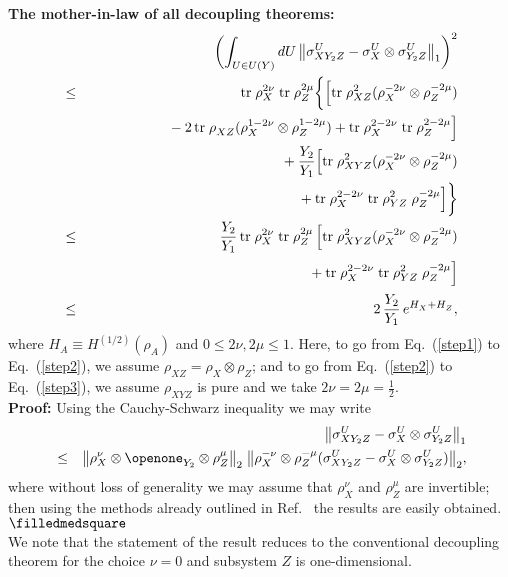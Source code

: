 \documentclass[twocolumn,aps,prl]{revtex4}
\begin{document}
\noindent
{\bf The mother-in-law of all decoupling theorems:}
\begin{eqnarray}
&&\biggl(\int_{U\in U(Y)}dU\,\bigl\| \sigma_{XY_2Z}^U-
\sigma_{X}^U\otimes \sigma_{Y_2Z}^U\bigr\|_1\biggr)^2\nonumber\\
&\le& {\text{tr}}\; \rho_{X}^{2\nu}\; {\text{tr}}\; \rho_{Z}^{2\mu}
\biggl\{\Bigl[ {\text{tr}}\; \rho_{XZ}^{2}
        ( \rho_{X}^{-2\nu}\otimes \rho_{Z}^{-2\mu})\nonumber\\
&&\phantom{{\text{tr}}\; \rho_{X}^{2\nu}\; {\text{tr}}\; \rho_{Z}^{2\mu}}
\;-2\, {\text{tr}}\; \rho_{XZ}^{\text{~}}
   (\rho_{X}^{1-2\nu}\otimes \rho_{Z}^{1-2\mu})
+{\text{tr}}\; \rho_{X}^{2-2\nu}\; {\text{tr}}\; \rho_{Z}^{2-2\mu}\Bigr]
\nonumber\\
&&\phantom{{\text{tr}}\; \rho_{X}^{2\nu}\; {\text{tr}} }
+\frac{Y_2}{Y_1}\Bigl[
{\text{tr}}\; \rho_{XYZ}^{2}
        ( \rho_{X}^{-2\nu}\otimes \rho_{Z}^{-2\mu}) \nonumber \\
&&\phantom{{\text{tr}}\; \rho_{X}^{2\nu}\; {\text{tr}}~~~~~~~~}
+{\text{tr}}\; \rho_{X}^{2-2\nu}\;
{\text{tr}}\; \rho_{YZ}^{2}\;\rho_{Z}^{-2\mu}\Bigr]
\biggr\} \label{step1}\\
&\le & \frac{Y_2}{Y_1}\, {\text{tr}}\; \rho_{X}^{2\nu}\;
{\text{tr}}\; \rho_{Z}^{2\mu}\,
\Bigl[
{\text{tr}}\; \rho_{XYZ}^{2}
        ( \rho_{X}^{-2\nu}\otimes \rho_{Z}^{-2\mu}) \nonumber \\
&&\phantom{\frac{Y_2}{Y_1}\, {\text{tr}}\; \rho_{X}^{2\nu}\; 
{\text{tr}}\; \rho_{Z}^{2\mu}\Bigl[\,}
+{\text{tr}}\; \rho_{X}^{2-2\nu}\; 
{\text{tr}}\; \rho_{YZ}^{2}\;\rho_{Z}^{-2\mu}\Bigr] \label{step2} \\
&\le & 2\, \frac{Y_2}{Y_1}\,
e^{H_X^{\text{~}}+H_Z^{\text{~}}},
\label{step3}
\end{eqnarray}
where $H_A^{\text{~}}\equiv H^{(1/2)}(\rho_A^{\text{~}})$
and $0\le 2\nu,2\mu\le 1$. Here, to go from Eq.~(\ref{step1})
to Eq.~(\ref{step2}), we assume
$\rho_{XZ}^{\text{~}}=\rho_X^{\text{~}}\otimes \rho_Z^{\text{~}}$; and
to go from Eq.~(\ref{step2}) to Eq.~(\ref{step3}), we assume
$\rho_{XYZ}^{\text{~}}$ is pure and we take $2\nu=2\mu=\frac{1}{2}$.
\\

\noindent
{\bf Proof:}
Using the Cauchy-Schwarz inequality we may write
\begin{eqnarray}
&&\bigl\| \sigma_{XY_2Z}^U-
\sigma_{X}^U\otimes \sigma_{Y_2Z}^U\bigr\|_1 \\
&\le& \bigl\| \rho_{X}^{\nu}\otimes\openone_{Y_2}^{\text{~}}\otimes
\rho_{Z}^{\mu} \bigr\|_2\;
\bigl\| \rho_{X}^{-\nu}\otimes \rho_{Z}^{-\mu}(\sigma_{XY_2Z}^U-
\sigma_{X}^U\otimes \sigma_{Y_2Z}^U)\bigr\|_2, \nonumber
\end{eqnarray}
where without loss of generality we may assume that $\rho_{X}^{\nu}$
and $\rho_{Z}^{\mu}$ are invertible; then using the methods already
outlined in Ref.~ the results are easily obtained.
$\hfill \ensuremath{\filledmedsquare}$\\
We note that the statement of the result reduces to the conventional
decoupling theorem for the choice $\nu=0$ and subsystem $Z$ is
one-dimensional.
\end{document}
